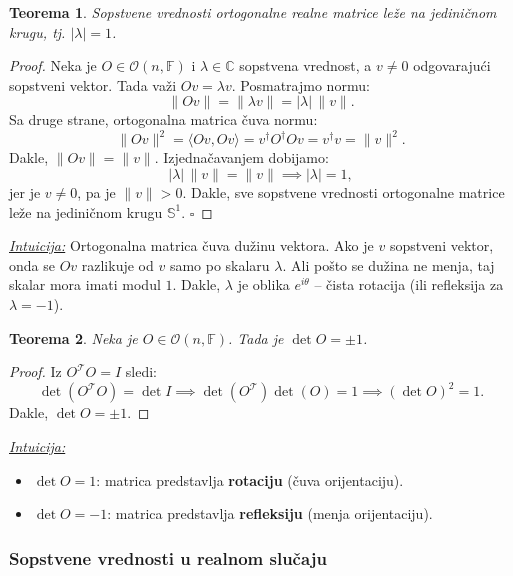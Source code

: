 \documentclass[a4paper,12pt,twoside]{report}
\newtheorem{theorem}{Teorema}[section]
\numberwithin{algorithm}{section}
\begin{document}
\begin{theorem}
    Sopstvene vrednosti ortogonalne realne matrice leže na jediničnom krugu, tj. $|\lambda| = 1$.
\end{theorem}
\begin{proof}
    Neka je $O \in \mathcal{O}(n, \mathbb{F})$ i $\lambda \in \mathbb{C}$ sopstvena vrednost, a $v \neq 0$ odgovarajući sopstveni vektor. Tada važi $Ov = \lambda v$. 
    Posmatrajmo normu:
    \[
        \|Ov\| = \|\lambda v\| = |\lambda| \, \|v\|.
    \]
    Sa druge strane, ortogonalna matrica čuva normu:
    \[
        \|Ov\|^2 = \langle Ov, Ov \rangle = v^\dagger O^\dagger O v = v^\dagger v = \|v\|^2.
    \]
    Dakle, $\|Ov\| = \|v\|$. Izjednačavanjem dobijamo:
    \[
        |\lambda| \, \|v\| = \|v\| \implies |\lambda| = 1,
    \]
    jer je $v \neq 0$, pa je $\|v\| > 0$. Dakle, sve sopstvene vrednosti ortogonalne matrice leže na jediničnom krugu $\mathbb{S}^1$. \(\square\)
\end{proof}

\noindent\underline{\textit{Intuicija:}} Ortogonalna matrica čuva dužinu vektora. Ako je $v$ sopstveni vektor, onda se $Ov$ razlikuje od $v$ samo po skalaru $\lambda$. Ali pošto se dužina ne menja, taj skalar mora imati modul $1$. Dakle, $\lambda$ je oblika $e^{i\theta}$ – čista rotacija (ili refleksija za $\lambda = -1$).

\begin{theorem}
    Neka je $O \in \mathcal{O}(n, \mathbb{F})$. Tada je $\det O = \pm 1$.
\end{theorem}
\begin{proof}
    Iz $O^\mathcal{T} O = I$ sledi:
    \[
        \det(O^\mathcal{T} O) = \det I \implies \det(O^\mathcal{T}) \det(O) = 1 \implies (\det O)^2 = 1.
    \]
    Dakle, $\det O = \pm 1$.
\end{proof}

\noindent\underline{\textit{Intuicija:}}
\begin{itemize}
    \item $\det O = 1$: matrica predstavlja \textbf{rotaciju} (čuva orijentaciju).
    \item $\det O = -1$: matrica predstavlja \textbf{refleksiju} (menja orijentaciju).
\end{itemize}

\subsubsection{Sopstvene vrednosti u realnom slučaju}
\end{document}
